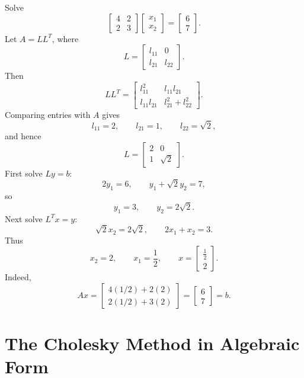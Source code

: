 \documentclass[11pt]{article}
\begin{document}
Solve
\[
\begin{bmatrix}4&2\\2&3\end{bmatrix}
\begin{bmatrix}x_1\\x_2\end{bmatrix}
=
\begin{bmatrix}6\\7\end{bmatrix}.
\]
Let $A=LL^T$, where
\[
L=\begin{bmatrix}l_{11}&0\\l_{21}&l_{22}\end{bmatrix}.
\]
Then
\[
LL^T=
\begin{bmatrix}
l_{11}^2 & l_{11}l_{21}\\
l_{11}l_{21} & l_{21}^2+l_{22}^2
\end{bmatrix}.
\]
Comparing entries with $A$ gives
\[
l_{11}=2,\qquad l_{21}=1,\qquad l_{22}=\sqrt{2},
\]
and hence
\[
L=\begin{bmatrix}2&0\\1&\sqrt{2}\end{bmatrix}.
\]
First solve $Ly=b$:
\[
2y_1=6,\qquad y_1+\sqrt{2}y_2=7,
\]
so
\[
y_1=3,\qquad y_2=2\sqrt{2}.
\]
Next solve $L^Tx=y$:
\[
\sqrt{2}x_2=2\sqrt{2},\qquad 2x_1+x_2=3.
\]
Thus
\[
x_2=2,\qquad x_1=\frac12,
\qquad
x=\begin{bmatrix}\frac12\\2\end{bmatrix}.
\]
Indeed,
\[
Ax=
\begin{bmatrix}4(1/2)+2(2)\\2(1/2)+3(2)\end{bmatrix}
=\begin{bmatrix}6\\7\end{bmatrix}=b.
\]

\section{The Cholesky Method in Algebraic Form}
\end{document}

